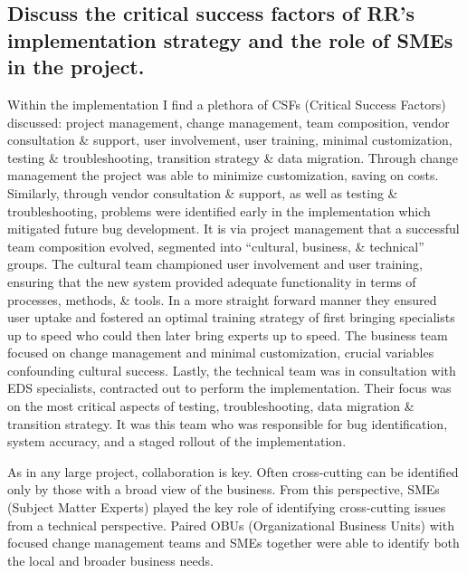 \documentclass{article}
\begin{document}
\subsection{Discuss the critical success factors of RR's implementation strategy and the role of
SMEs in the project.}
Within the implementation I find a plethora of CSFs (Critical Success Factors) discussed: project management, change management, team composition, vendor consultation \& support, user involvement, user training, minimal customization, testing \& troubleshooting, transition strategy \& data migration.
Through change management the project was able to minimize customization, saving on costs.
Similarly, through vendor consultation \& support, as well as testing \& troubleshooting, problems were identified early in the implementation which mitigated future bug development.
It is via project management that a successful team composition evolved, segmented into ``cultural, business, \& technical'' groups.
The cultural team championed user involvement and user training, ensuring that the new system provided adequate functionality in terms of processes, methods, \& tools.
In a more straight forward manner they ensured user uptake and fostered an optimal training strategy of first bringing specialists up to speed who could then later bring experts up to speed.
The business team focused on change management and minimal customization, crucial variables confounding cultural success.
Lastly, the technical team was in consultation with EDS specialists, contracted out to perform the implementation.
Their focus was on the most critical aspects of testing, troubleshooting, data migration \& transition strategy.
It was this team who was responsible for bug identification, system accuracy, and a staged rollout of the implementation.

As in any large project, collaboration is key.
Often cross-cutting can be identified only by those with a broad view of the business.
From this perspective, SMEs (Subject Matter Experts) played the key role of identifying cross-cutting issues from a technical perspective.
Paired OBUs (Organizational Business Units) with focused change management teams and SMEs together were able to identify both the local and broader business needs.
\end{document}
